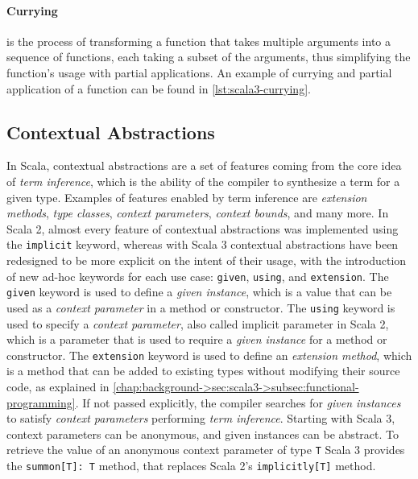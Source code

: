 

\paragraph{Currying} is the process of transforming a function that takes multiple arguments into a sequence of functions, each taking a subset of the arguments, thus simplifying the function's usage with partial applications.
%
An example of currying and partial application of a function can be found in \cref{lst:scala3-currying}.




\subsection{Contextual Abstractions} \label{chap:background->sec:scala3->subsec:contextual-abstractions}

In Scala, contextual abstractions are a set of features coming from the core idea of \textit{term inference}, which is the ability of the compiler to synthesize a  term for a given type.
%
Examples of features enabled by term inference are \textit{extension methods}, \textit{type classes}, \textit{context parameters}, \textit{context bounds}, and many more.
%
In Scala 2, almost every feature of contextual abstractions was implemented using the \texttt{implicit} keyword, whereas with Scala 3 contextual abstractions have been redesigned to be more explicit on the intent of their usage, with the introduction of new ad-hoc keywords for each use case: \texttt{given}, \texttt{using}, and \texttt{extension}.
%
The \texttt{given} keyword is used to define a \textit{given instance}, which is a value that can be used as a \textit{context parameter} in a method or constructor.
%
The \texttt{using} keyword is used to specify a \textit{context parameter}, also called implicit parameter in Scala 2, which is a parameter that is used to require a \textit{given instance} for a method or constructor.
%
The \texttt{extension} keyword is used to define an \textit{extension method}, which is a method that can be added to existing types without modifying their source code, as explained in \cref{chap:background->sec:scala3->subsec:functional-programming}.
%
If not passed explicitly, the compiler searches for \textit{given instances} to satisfy \textit{context parameters} performing \textit{term inference}.
%
Starting with Scala 3, context parameters can be anonymous, and given instances can be abstract.
%
To retrieve the value of an anonymous context parameter of type \texttt{T} Scala 3 provides the \texttt{summon[T]: T} method, that replaces Scala 2's \texttt{implicitly[T]} method.

